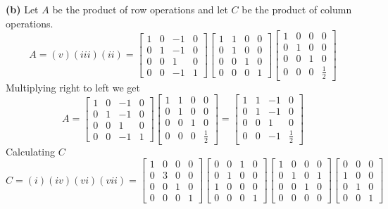 \documentclass[11pt]{article}
\begin{document}
\textbf{(b)}
Let $A$ be the product of row operations and let $C$ be the product of column operations.
$$
A=(v)(iii)(ii)=\begin{bmatrix}
1&0&-1&0\\
0&1&-1&0\\
0&0&1&0\\
0&0&-1&1
\end{bmatrix}
\begin{bmatrix}
1&1&0&0\\
0&1&0&0\\
0&0&1&0\\
0&0&0&1
\end{bmatrix}
\begin{bmatrix}
1&0&0&0\\
0&1&0&0\\
0&0&1&0\\
0&0&0&\frac12
\end{bmatrix}
$$
Multiplying right to left we get
$$
A=\begin{bmatrix}
1&0&-1&0\\
0&1&-1&0\\
0&0&1&0\\
0&0&-1&1
\end{bmatrix}
\begin{bmatrix}
1&1&0&0\\
0&1&0&0\\
0&0&1&0\\
0&0&0&\frac12
\end{bmatrix}
=
\begin{bmatrix}
1&1&-1&0\\
0&1&-1&0\\
0&0&1&0\\
0&0&-1&\frac12
\end{bmatrix}
$$
Calculating $C$
$$
C=(i)(iv)(vi)(vii)=
\begin{bmatrix}
    1 & 0&0&0\\
    0&3&0&0\\
    0&0&1&0\\
    0&0&0&1
\end{bmatrix}
\begin{bmatrix}
0&0&1&0\\
0&1&0&0\\
1&0&0&0\\
0&0&0&1
\end{bmatrix}
\begin{bmatrix}
1&0&0&0\\
0&1&0&1\\
0&0&1&0\\
0&0&0&0
\end{bmatrix}
\begin{bmatrix}
0&0&0\\
1&0&0\\
0&1&0\\
0&0&1
\end{bmatrix}
$$
\end{document}

